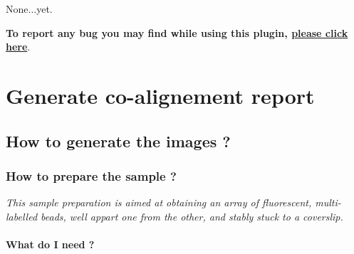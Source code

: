 \documentclass[a4paper, 11pt]{report}%
\makeatletter
\newcommand{\mailbug}{\begin{center}\textbf{To report any bug you may find while using this plugin, \href{mailto:fabrice.cordelieres@gmail.com,cedric.matthews@ibdml.univ-mrs.fr ?subject=Bug\%20found\%20in\%20MetroloJ&body=\%0ABug\%20description:\%0A\%0AHow\%20did\%20it\%20happen:\%0A\%0ACopy/Paste\%20the\%20content\%20of\%20the\%20log\%20window\%0A\%0AVersion\%20of\%20ImageJ:\%0A\%0AVersion\%20of\%20Java:}{please click here}}.\end{center}}
\makeatother
\begin{document}
None...yet.

\mailbug

\chapter{Generate co-alignement report}
\label{chap:gcoar}

\section{How to generate the images ?}
\label{sec:gcoar-what}

\subsection{How to prepare the sample ?}
\label{sec:gcoar-proto}

\textit{This sample preparation is aimed at obtaining an array of fluorescent, multi-labelled beads, well appart one from the other, and stably stuck to a coverslip.}

\subsubsection{What do I need ?}
\label{sec:gcoar-proto-what}
\end{document}
